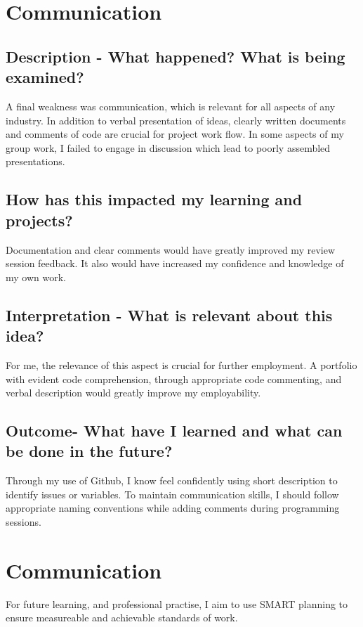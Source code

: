 \documentclass{scrartcl}
\begin{document}
\section{Communication}

\subsection{Description - What happened? What is being examined?}

A final weakness was communication, which is relevant for all aspects of any industry. In addition to verbal presentation of ideas, clearly written documents and comments of code are crucial for project work flow. In some aspects of my group work, I failed to engage in discussion which lead to poorly assembled presentations.

\subsection{How has this impacted my learning and projects?}

Documentation and clear comments would have greatly improved my review session feedback. It also would have increased my confidence and knowledge of my own work.

\subsection{Interpretation - What is relevant about this idea?}

For me, the relevance of this aspect is crucial for further employment. A portfolio with evident code comprehension, through appropriate code commenting, and verbal description would greatly improve my employability.

\subsection{Outcome- What have I learned and what can be done in the future?}

Through my use of Github, I know feel confidently using short description to identify issues or variables. To maintain communication skills, I should follow appropriate naming conventions while adding comments during programming sessions.

\section{Communication}

For future learning, and professional practise, I aim to use SMART planning to ensure measureable and achievable standards of work.

%
%
\end{document}
